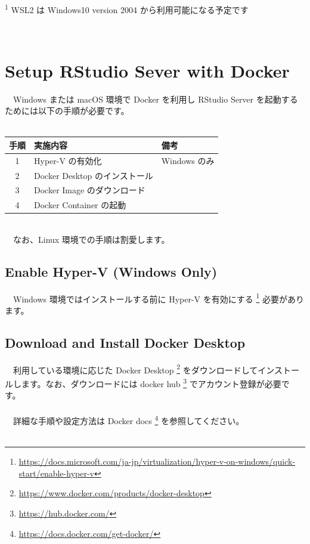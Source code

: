 \documentclass[
  12pt,
]{book}
\DeclareRobustCommand{\href}[2]{#2\footnote{\url{#1}}}
\begin{document}
　\\
\textsuperscript{1} WSL2 は Windows10 version 2004 から利用可能になる予定です

　

\hypertarget{setup-rstudio-sever-with-docker}{%
\section{Setup RStudio Sever with Docker}\label{setup-rstudio-sever-with-docker}}

　Windows または macOS 環境で Docker を利用し RStudio Server を起動するためには以下の手順が必要です。\\
　

\begin{longtable}[]{@{}cll@{}}
\toprule
手順 & 実施内容 & 備考 \\
\midrule
\endhead
1 & Hyper-V の有効化 & Windows のみ \\
2 & Docker Desktop のインストール & \\
3 & Docker Image のダウンロード & \\
4 & Docker Container の起動 & \\
\bottomrule
\end{longtable}

　\\
　なお、Linux 環境での手順は割愛します。 　

\hypertarget{enable-hyper-v-windows-only}{%
\subsection{Enable Hyper-V (Windows Only)}\label{enable-hyper-v-windows-only}}

　Windows 環境ではインストールする前に \href{https://docs.microsoft.com/ja-jp/virtualization/hyper-v-on-windows/quick-start/enable-hyper-v}{Hyper-V を有効にする } 必要があります。

\hypertarget{download-and-install-docker-desktop}{%
\subsection{Download and Install Docker Desktop}\label{download-and-install-docker-desktop}}

　利用している環境に応じた \href{https://www.docker.com/products/docker-desktop}{Docker Desktop } をダウンロードしてインストールします。なお、ダウンロードには \href{https://hub.docker.com/}{docker hub } でアカウント登録が必要です。\\
　\\
　詳細な手順や設定方法は \href{https://docs.docker.com/get-docker/}{Docker docs } を参照してください。\\
　
\end{document}
